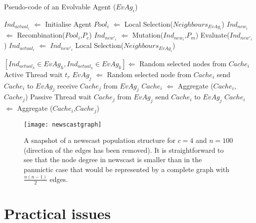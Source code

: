 \begin{algorithm}
\caption{Pseudo-code of an Evolvable Agent ($EvAg_i$)}
\label{alg:evag}
\scriptsize
\begin{algorithmic}

\STATE
\STATE $Ind_{actual_i}$ $\Leftarrow$ Initialise Agent
\STATE $Pool_i$  $\Leftarrow$ Local Selection($Neighbours_{EvAg_i}$)
\STATE $Ind_{new_i}$ $\Leftarrow$ Recombination($Pool_i$,$P_{c}$) 
\STATE $Ind_{new'_i}$ $\Leftarrow$ Mutation($Ind_{new_i}$,$P_{m}$) 
\STATE Evaluate($Ind_{new'_i}$) 
\STATE    $Ind_{actual_i}$ $\Leftarrow$ $Ind_{new'_i}$
\ENDIF
\ENDWHILE
\STATE
\STATE Local Selection($Neighbours_{EvAg_i}$)

\STATE $[Ind_{actual_h} \in EvAg_h,Ind_{actual_k} \in EvAg_k] \Leftarrow$ Random selected nodes from $Cache_i$
\STATE
{}
\STATE
\STATE Active Thread
\LOOP 
\STATE wait $t_r$
\STATE $EvAg_j$ $\Leftarrow$ Random selected node from $Cache_i$
\STATE send $Cache_i$ to $EvAg_j$
\STATE receive $Cache_j$ from $EvAg_j$
\STATE $Cache_i$ $\Leftarrow$ Aggregate ($Cache_i$,$Cache_j$)
\ENDLOOP
\STATE
\STATE Passive Thread
\LOOP
\STATE wait $Cache_j$ from $EvAg_j$
\STATE send $Cache_i$ to $EvAg_j$
\STATE $Cache_i$ $\Leftarrow$ Aggregate ($Cache_i$,$Cache_j$)
\ENDLOOP
\STATE

\end{algorithmic}
\end{algorithm}




\begin{figure*}[htbp]
\centerline{\texttt{[image: newscastgraph]}}
\caption{A snapshot of a newscast population structure for $c=4$ and $n=100$ (direction of the edges has been removed). It is straightforward to see that the node degree in newscast is smaller than in the panmictic case that would be represented by a complete graph with $\frac{n(n-1)}{2}$ edges.}
\label{fig:newscastsnapshot}
\end{figure*}


\clearpage
\section{Practical issues}
\label{sec:practicalissues}

